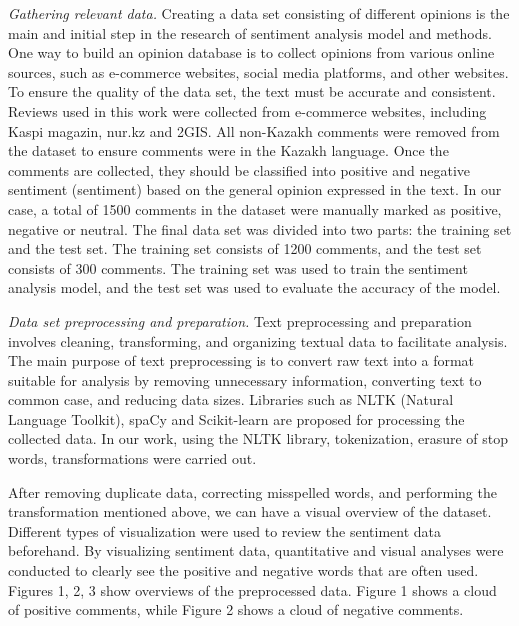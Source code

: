 \emph{Gathering relevant data.} Creating a data set consisting of
different opinions is the main and initial step in the research of
sentiment analysis model and methods. One way to build an opinion
database is to collect opinions from various online sources, such as
e-commerce websites, social media platforms, and other websites. To
ensure the quality of the data set, the text must be accurate and
consistent. Reviews used in this work were collected from e-commerce
websites, including Kaspi magazin, nur.kz and 2GIS. All non-Kazakh
comments were removed from the dataset to ensure comments were in the
Kazakh language. Once the comments are collected, they should be
classified into positive and negative sentiment (sentiment) based on the
general opinion expressed in the text. In our case, a total of 1500
comments in the dataset were manually marked as positive, negative or
neutral. The final data set was divided into two parts: the training set
and the test set. The training set consists of 1200 comments, and the
test set consists of 300 comments. The training set was used to train
the sentiment analysis model, and the test set was used to evaluate the
accuracy of the model.

\emph{Data set preprocessing and preparation.} Text preprocessing and
preparation involves cleaning, transforming, and organizing textual data
to facilitate analysis. The main purpose of text preprocessing is to
convert raw text into a format suitable for analysis by removing
unnecessary information, converting text to common case, and reducing
data sizes. Libraries such as NLTK (Natural Language Toolkit), spaCy and
Scikit-learn are proposed for processing the collected data. In our
work, using the NLTK library, tokenization, erasure of stop words,
transformations were carried out.

After removing duplicate data, correcting misspelled words, and
performing the transformation mentioned above, we can have a visual
overview of the dataset. Different types of visualization were used to
review the sentiment data beforehand. By visualizing sentiment data,
quantitative and visual analyses were conducted to clearly see the
positive and negative words that are often used. Figures 1, 2, 3 show
overviews of the preprocessed data. Figure 1 shows a cloud of positive
comments, while Figure 2 shows a cloud of negative comments.

